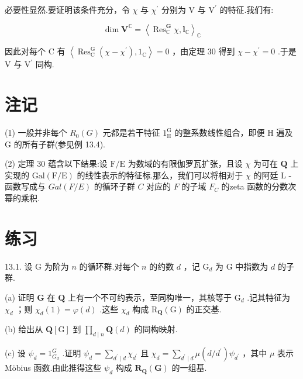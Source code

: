 \documentclass[10pt]{article}
\begin{document}
必要性显然.要证明该条件充分，令 \(\chi\) 与 \({\chi }^{\prime }\) 分别为 \(\mathrm{V}\) 与 \({\mathrm{V}}^{\prime }\) 的特征.我们有:

\[
\dim {\mathbf{V}}^{\mathbb{C}} = {\left\langle  {\operatorname{Res}}_{\mathbb{C}}^{\mathbf{G}}\chi ,{\mathbf{l}}_{\mathbb{C}}\right\rangle  }_{\mathbb{C}}
\]

因此对每个 \(\mathrm{C}\) 有 \(\left\langle  {{\operatorname{Res}}_{\mathrm{C}}^{\mathrm{G}}\left( {\chi  - {\chi }^{\prime }}\right) ,{1}_{\mathrm{C}}}\right\rangle   = 0\) ，由定理 30 得到 \(\chi  - {\chi }^{\prime } = 0\) .于是 \(\mathrm{V}\) 与 \({\mathrm{V}}^{\prime }\) 同构.

\section*{注记}

(1) 一般并非每个 \({R}_{0}\left( G\right)\) 元都是若干特征 \({1}_{\mathrm{H}}^{\mathrm{G}}\) 的整系数线性组合，即便 \(\mathrm{H}\) 遍及 \(\mathrm{G}\) 的所有子群(参见例 13.4).

(2) 定理 30 蕴含以下结果:设 \(\mathrm{F}/\mathrm{E}\) 为数域的有限伽罗瓦扩张，且设 \(\chi\) 为可在 \(\mathbf{Q}\) 上实现的 \(\mathrm{{Gal}}\left( {\mathrm{F}/\mathrm{E}}\right)\) 的线性表示的特征标.那么，我们可以将相对于 \(\chi\) 的阿廷 L - 函数写成与 \({Gal}\left( {F/E}\right)\) 的循环子群 \(C\) 对应的 \(F\) 的子域 \({F}_{C}\) 的zeta 函数的分数次幂的乘积.

\section*{练习}

13.1. 设 \(\mathrm{G}\) 为阶为 \(n\) 的循环群.对每个 \(n\) 的约数 \(d\) ，记 \({\mathrm{G}}_{d}\) 为 \(\mathrm{G}\) 中指数为 \(d\) 的子群.

(a) 证明 \(\mathbf{G}\) 在 \(\mathbf{Q}\) 上有一个不可约表示，至同构唯一，其核等于 \({\mathrm{G}}_{d}\) .记其特征为 \({\chi }_{d}\) ；则 \({\chi }_{d}\left( 1\right)  = \varphi \left( d\right)\) .这些 \({\chi }_{d}\) 构成 \({\mathrm{R}}_{\mathbf{Q}}\left( \mathrm{G}\right)\) 的正交基.

(b) 给出从 \(\mathbf{Q}\left\lbrack  \mathrm{G}\right\rbrack\) 到 \(\mathop{\prod }\limits_{{d \mid  n}}\mathbf{Q}\left( d\right)\) 的同构映射.

(c) 设 \({\psi }_{d} = {1}_{{G}_{d}}^{G}\) .证明 \({\psi }_{d} = \mathop{\sum }\limits_{{{d}^{\prime } \mid  d}}{\chi }_{{d}^{\prime }}\) 且 \({\chi }_{d} = \mathop{\sum }\limits_{{{d}^{\prime } \mid  d}}\mu \left( {d/{d}^{\prime }}\right) {\psi }_{{d}^{\prime }}\) ，其中 \(\mu\) 表示 Möbius 函数.由此推得这些 \({\psi }_{d}\) 构成 \({\mathbf{R}}_{\mathbf{Q}}\left( \mathbf{G}\right)\) 的一组基.
\end{document}
